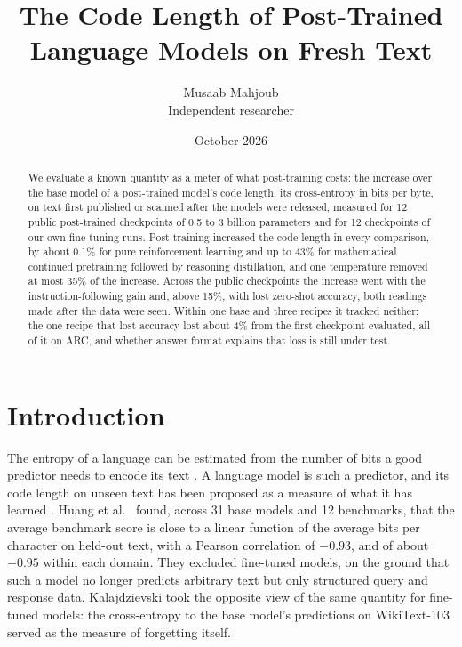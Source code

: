 \documentclass[11pt,a4paper]{article}
\title{\vspace{-1.6cm}The Code Length of Post-Trained Language Models on Fresh Text}
\author{Musaab Mahjoub\\[0.3ex]\normalsize Independent researcher}
\date{October 2026}
\theoremstyle{definition}
\begin{document}
\maketitle

\begin{abstract}
\noindent We evaluate a known quantity as a meter of what post-training costs: the increase over the base model
of a post-trained model's code length, its cross-entropy in bits per byte, on text first published or scanned
after the models were released, measured for 12 public post-trained checkpoints of 0.5 to 3 billion parameters
and for 12 checkpoints of our own fine-tuning runs. Post-training increased the code length in every comparison,
by about 0.1\% for pure reinforcement learning and up to 43\% for mathematical continued pretraining followed by
reasoning distillation, and one temperature removed at most 35\% of the increase. Across the public checkpoints
the increase went with the instruction-following gain and, above 15\%, with lost zero-shot accuracy, both
readings made after the data were seen. Within one base and three recipes it tracked neither: the one recipe that
lost accuracy lost about 4\% from the first checkpoint evaluated, all of it on ARC, and whether answer format
explains that loss is still under test.
\end{abstract}

\section{Introduction}

The entropy of a language can be estimated from the number of bits a good predictor needs to encode its text
\citep{shannon1948,shannon1951,cover1978}. A language model is such a predictor, and its code length on unseen
text has been proposed as a measure of what it has learned \citep{deletang2024compression,huang2024compression,
lotfi2024bounds}. Huang et al.\ \citep{huang2024compression} found, across 31 base models and 12 benchmarks, that
the average benchmark score is close to a linear function of the average bits per character on held-out text,
with a Pearson correlation of $-0.93$, and of about $-0.95$ within each domain. They excluded fine-tuned models, on
the ground that such a model no longer predicts arbitrary text but only structured query and response data.
Kalajdzievski \citep{kalajdzievski2024scaling} took the opposite view of the same quantity for fine-tuned models:
the cross-entropy to the base model's predictions on WikiText-103 served as the measure of forgetting itself.
\end{document}
